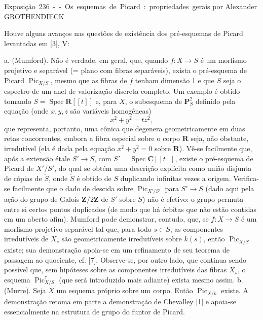 \unit{Exposição 236 -- Os esquemas de Picard: propriedades gerais}
%
  {por Alexander GROTHENDIECK}


Houve alguns avanços nas questões de existência dos pré-esquemas de Picard
levantadas em [3], V:

\medskip
\noindent a. (Mumford). Não é verdade, em geral, que, quando
$f:X\longrightarrow S$ é um morfismo projetivo e separável (= plano com fibras
separáveis), exista o pré-esquema de Picard $\operatorname{Pic}_{X/S}$, mesmo
que as fibras de $f$ tenham dimensão 1 e que $S$ seja o espectro de um anel de
valorização discreta completo. Um exemplo é obtido tomando
$S=\operatorname{Spec}\mathbf R[[t]]$ e, para $X$, o subesquema de
$\mathbf P^2_S$ definido pela equação (onde $x,y,z$ são variáveis homogêneas)
\[
x^2+y^2=tz^2,
\]
que representa, portanto, uma cônica que degenera geometricamente em duas
retas concorrentes, embora a fibra especial sobre o corpo $\mathbf R$ seja,
não obstante, irredutível (ela é dada pela equação $x^2+y^2=0$ sobre
$\mathbf R$). Vê-se facilmente que, após a extensão étale
$S'\longrightarrow S$, com $S'=\operatorname{Spec}\mathbf C[[t]]$, existe o
pré-esquema de Picard de $X'/S'$, do qual se obtém uma descrição explícita como
união disjunta de cópias de $\widetilde S$, onde $\widetilde S$ é obtido de
$S$ duplicando infinitas vezes a origem. Verifica-se facilmente que o dado de
descida sobre $\operatorname{Pic}_{X'/S'}$ para $S'\longrightarrow S$ (dado
aqui pela ação do grupo de Galois $\mathbf Z/2\mathbf Z$ de $S'$ sobre $S$)
não é efetivo: o grupo permuta entre si certos pontos duplicados (de modo que
há órbitas que não estão contidas em um aberto afim). Mumford pode demonstrar,
contudo, que, se $f:X\longrightarrow S$ é um morfismo projetivo separável tal
que, para todo $s\in S$, as componentes irredutíveis de $X_s$ são
geometricamente irredutíveis sobre $k(s)$, então
$\operatorname{Pic}_{X/S}$ existe; sua demonstração apoia-se em um refinamento
de seu teorema de passagem ao quociente, cf. [7]. Observe-se, por outro lado,
que continua sendo possível que, sem hipóteses sobre as componentes
irredutíveis das fibras $X_s$, o esquema $\operatorname{Pic}^{\tau}_{X/S}$
(que será introduzido mais adiante) exista mesmo assim.
\noindent b. (Murre). Seja $X$ um esquema próprio sobre um corpo. Então
$\operatorname{Pic}_{X/k}$ existe. A demonstração retoma em parte a
demonstração de Chevalley [1] e apoia-se essencialmente na estrutura de grupo
do funtor de Picard.

